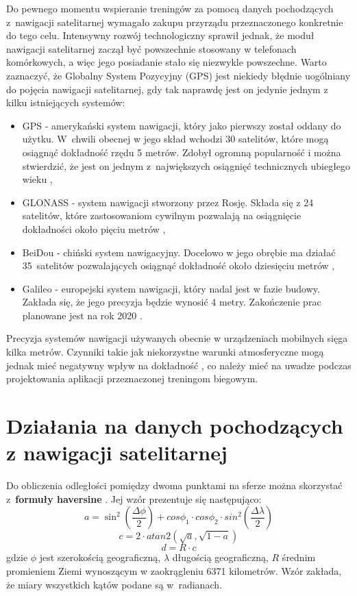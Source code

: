 Do pewnego momentu wspieranie treningów za pomocą danych pochodzących z~nawigacji satelitarnej wymagało zakupu przyrządu przeznaczonego konkretnie do tego celu. Intensywny rozwój technologiczny sprawił jednak, że moduł nawigacji satelitarnej zaczął być powszechnie stosowany w telefonach komórkowych, a więc jego posiadanie stało się niezwykle powszechne. Warto zaznaczyć, że Globalny System Pozycyjny (GPS) jest niekiedy błędnie uogólniany do pojęcia nawigacji satelitarnej, gdy tak naprawdę jest on jedynie jednym z kilku istniejących systemów:
\begin{itemize}
\item{GPS} - amerykański system nawigacji, który jako pierwszy został oddany do użytku. W~chwili obecnej w jego skład wchodzi 30 satelitów, które mogą osiągnąć dokładność rzędu 5 metrów. Zdobył ogromną popularność i można stwierdzić, że jest on jednym z~największych osiągnięć technicznych ubiegłego wieku \cite{gpsgov},
\item{GLONASS} - system nawigacji stworzony przez Rosję. Składa się z 24 satelitów, które zastosowaniom cywilnym pozwalają na osiągnięcie dokładności około pięciu metrów \cite{gps2},
\item{BeiDou} - chiński system nawigacyjny. Docelowo w jego obrębie ma działać 35~satelitów pozwalających osiągnąć dokładność około dziesięciu metrów \cite{gps2,baidu1},
\item{Galileo} - europejski system nawigacji, który nadal jest w fazie budowy. Zakłada się, że jego precyzja będzie wynosić 4 metry. Zakończenie prac planowane jest na rok 2020 \cite{stronkagps1,gps2}.
\end{itemize}
Precyzja systemów nawigacji używanych obecnie w urządzeniach mobilnych sięga kilka metrów. Czynniki takie jak niekorzystne warunki atmosferyczne mogą jednak mieć negatywny wpływ na dokładność \cite{gps2}, co należy mieć na uwadze podczas projektowania aplikacji przeznaczonej treningom biegowym.

\section{Działania na danych pochodzących z nawigacji satelitarnej}\label{chap:dzialania}
Do obliczenia odległości pomiędzy dwoma punktami na sferze można skorzystać z~\textbf{formuły haversine} \cite{haversine}. Jej wzór prezentuje się następująco:\\
\begin{equation}\label{eq:haversine11}
a = \sin ^2(\frac{\Delta  \phi}{2}) + cos  \phi_1 \cdot cos\phi_2 \cdot sin^2(\frac{\Delta \lambda}{2})
\end{equation}
\begin{equation}\label{eq:haversine2}
c = 2 \cdot atan2( \sqrt{a}, \sqrt{1-a})
\end{equation}
\begin{equation}\label{eq:haversine3}
d = R \cdot c
\end{equation}
gdzie \(\phi\) jest szerokością geograficzną, \(\lambda\) długością geograficzną, \(R\) średnim promieniem Ziemi wynoszącym w zaokrągleniu 6371 kilometrów. Wzór zakłada, że miary wszystkich kątów podane są w~radianach.



